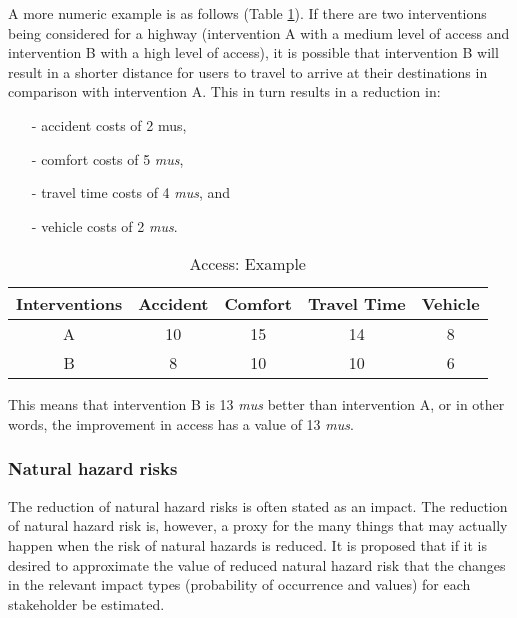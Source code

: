 A more numeric example is as follows (Table \ref{tbl:27}). If there are two interventions being considered for a highway (intervention A with a medium level of access and intervention B with a high level of access), it is possible that intervention B will result in a shorter distance for users to travel to arrive at their destinations in comparison with intervention A. This in turn results in a reduction in:

\begin{itemize}
	\item[-] accident costs of 2 mus, 
	\item[-] comfort costs of 5 \textit{mus},
	\item[-] travel time costs of 4 \textit{mus}, and
	\item[-] vehicle costs of 2 \textit{mus}.
\end{itemize}

\begin{table}
\caption{Access: Example}
\begin{tabular}{|l|l|l|l|l|}
\hline
\multicolumn{1}{|c|}{Interventions} & \multicolumn{1}{c|}{Accident} & \multicolumn{1}{c|}{Comfort} & \multicolumn{1}{c|}{Travel Time} & \multicolumn{1}{c|}{Vehicle} \\ 
\hline
\multicolumn{1}{|c|}{A} & \multicolumn{1}{c|}{10} & \multicolumn{1}{c|}{15} & \multicolumn{1}{c|}{14} & \multicolumn{1}{c|}{8} \\ 
\hline
\multicolumn{1}{|c|}{B} & \multicolumn{1}{c|}{8} & \multicolumn{1}{c|}{10} & \multicolumn{1}{c|}{10} & \multicolumn{1}{c|}{6} \\ 
\hline
\end{tabular}
\label{tbl:27}
\end{table}

This means that intervention B is 13 \textit{mus} better than intervention A, or in other words, the improvement in access has a value of 13 \textit{mus}.

\subsubsection{Natural hazard risks}

The reduction of natural hazard risks is often stated as an impact. The reduction of natural hazard risk is, however, a proxy for the many things that may actually happen when the risk of natural hazards is reduced. It is proposed that if it is desired to approximate the value of reduced natural hazard risk that the changes in the relevant impact types (probability of occurrence and values) for each stakeholder be estimated.

